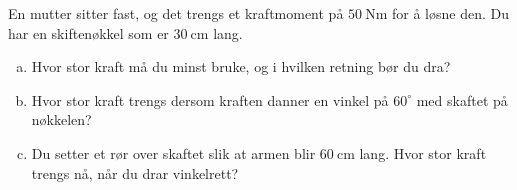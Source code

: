 %
En mutter sitter fast, og det trengs et kraftmoment på $\SI{50}{\newton\metre}$ for å løsne den. Du har en skiftenøkkel som er $\SI{30}{\centi\metre}$ lang.
\begin{enumerate}[a)]
    \item Hvor stor kraft må du minst bruke, og i hvilken retning bør du dra?
    \item Hvor stor kraft trengs dersom kraften danner en vinkel på $60^\circ$ med skaftet på nøkkelen?
    \item Du setter et rør over skaftet slik at armen blir $\SI{60}{\centi\metre}$ lang. Hvor stor kraft trengs nå, når du drar vinkelrett?
\end{enumerate}
